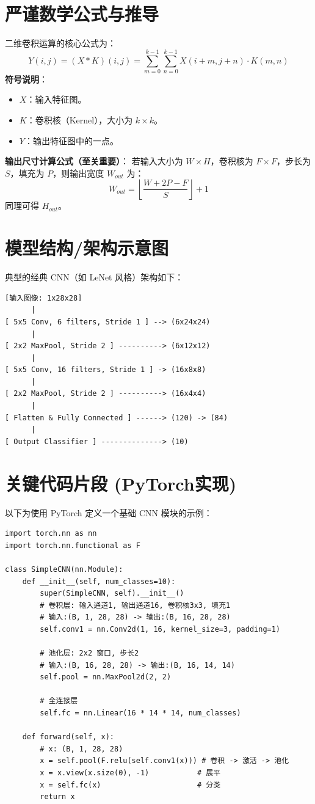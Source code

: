 \documentclass[12pt, a4paper]{book}
\begin{document}
\section{严谨数学公式与推导}
二维卷积运算的核心公式为：
$$
Y(i,j) = (X * K)(i,j) = \sum_{m=0}^{k-1} \sum_{n=0}^{k-1} X(i+m, j+n) \cdot K(m,n)
$$
\textbf{符号说明}：
\begin{itemize}
    \item $X$：输入特征图。
    \item $K$：卷积核（Kernel），大小为 $k \times k$。
    \item $Y$：输出特征图中的一点。
\end{itemize}

\textbf{输出尺寸计算公式（至关重要）}：
若输入大小为 $W \times H$，卷积核为 $F \times F$，步长为 $S$，填充为 $P$，则输出宽度 $W_{out}$ 为：
$$
W_{out} = \left\lfloor \frac{W + 2P - F}{S} \right\rfloor + 1
$$
同理可得 $H_{out}$。

\section{模型结构/架构示意图}
典型的经典 CNN（如 LeNet 风格）架构如下：
\begin{verbatim}
[输入图像: 1x28x28]
      |
[ 5x5 Conv, 6 filters, Stride 1 ] --> (6x24x24)
      |
[ 2x2 MaxPool, Stride 2 ] ----------> (6x12x12)
      |
[ 5x5 Conv, 16 filters, Stride 1 ] -> (16x8x8)
      |
[ 2x2 MaxPool, Stride 2 ] ----------> (16x4x4)
      |
[ Flatten & Fully Connected ] ------> (120) -> (84)
      |
[ Output Classifier ] --------------> (10)
\end{verbatim}

\section{关键代码片段 (PyTorch实现)}
以下为使用 PyTorch 定义一个基础 CNN 模块的示例：

\begin{lstlisting}
import torch.nn as nn
import torch.nn.functional as F

class SimpleCNN(nn.Module):
    def __init__(self, num_classes=10):
        super(SimpleCNN, self).__init__()
        # 卷积层: 输入通道1, 输出通道16, 卷积核3x3, 填充1
        # 输入:(B, 1, 28, 28) -> 输出:(B, 16, 28, 28)
        self.conv1 = nn.Conv2d(1, 16, kernel_size=3, padding=1)
        
        # 池化层: 2x2 窗口, 步长2
        # 输入:(B, 16, 28, 28) -> 输出:(B, 16, 14, 14)
        self.pool = nn.MaxPool2d(2, 2)
        
        # 全连接层
        self.fc = nn.Linear(16 * 14 * 14, num_classes)

    def forward(self, x):
        # x: (B, 1, 28, 28)
        x = self.pool(F.relu(self.conv1(x))) # 卷积 -> 激活 -> 池化
        x = x.view(x.size(0), -1)           # 展平
        x = self.fc(x)                      # 分类
        return x
\end{lstlisting}
\end{document}
